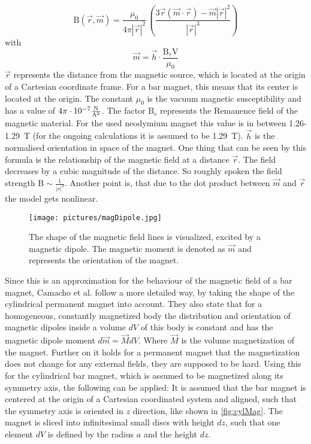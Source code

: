 \begin{equation} \label{eq:dipole}
\mathrm{B}(\vec{r},\vec{m}) = 
\frac{\mu_{0}}{4 \pi |\vec{r}|^{2}} \, \left (\frac{3 \vec{r} (\vec{m} \cdot \vec{r}) - \vec{m}|\vec{r}|^{2} }{|\vec{r}|^3} \right)						
\end{equation}
with 
\begin{equation*} \label{eq:magMoment}
\vec{m} = \vec{h} \cdot \frac{\mathrm{B}_r \mathrm{V}}{\mu_{0}}
\end{equation*}
$ \vec{r} $ represents the distance from the magnetic source, which is located at the origin of a Cartesian coordinate frame. For a bar magnet, this means that its center is located at the origin. The constant $ \mu_{0} $ is the vacuum magnetic susceptibility \cite{camacho2013alternative} and has a value of $ 4 \pi \cdot 10^{-7}\si[per-mode=fraction]{\newton \per \ampere \squared}$. The factor $ \mathrm{B}_r $ represents the Remanence field of the magnetic material. For the used neodymium magnet this value is in between 1.26-\SI{1.29}{\tesla} (for the ongoing calculations it is assumed to be \SI{1.29}{\tesla}). $ \vec{h} $ is the normalised orientation in space of the magnet. One thing that can be seen by this formula is the relationship of the magnetic field at a distance $ \vec{r} $. The field decreases by a cubic magnitude of the distance. So roughly spoken the field strength $ \mathrm{B} \sim \frac{1}{|r|^ {3}}$. Another point is, that due to the dot product between $ \vec{m} $ and $ \vec{r} $ the model gets nonlinear.\\
\begin{figure}
\centering
\texttt{[image: pictures/magDipole.jpg]}
\caption[Magnetic field lines, excited by a dipole.]
{The shape of the magnetic field lines is visualized, excited by a magnetic dipole. The magnetic moment is denoted as $ \vec{m} $ and represents the orientation of the magnet.}
\label{fig:magDipole}
\end{figure}
Since this is an approximation for the behaviour of the magnetic field of a bar magnet, Camacho et al. \cite{camacho2013alternative} follow a more detailed way, by taking the shape of the cylindrical permanent magnet into account. They also state that for a homogeneous, constantly magnetized body the distribution and orientation of magnetic dipoles inside a volume $ dV $ of this body is constant and has the magnetic dipole moment $ d\vec{m} = \vec{M}dV $. Where $ \vec{M} $ is the volume magnetization of the magnet. Further on it holds for a permanent magnet that the magnetization does not change for any external fields, they are supposed to be hard. Using this for the cylindrical bar magnet, which is assumed to be magnetized along its symmetry axis, the following can be applied: It is assumed that the bar magnet is centered at the origin of a Cartesian coordinated system and aligned, such that the symmetry axis is oriented in $ z $ direction, like shown in \ref{fig:cylMag}. The magnet is sliced into infinitesimal small discs with height $ dz $, such that one element $ dV $ is defined by the radius $ a $ and the height $ dz $. 
